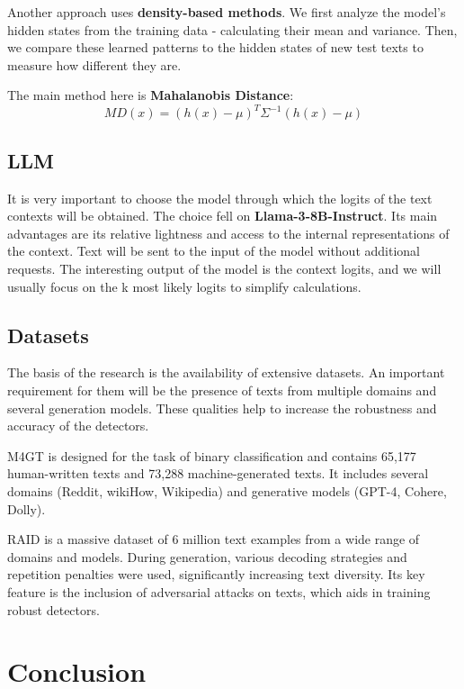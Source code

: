 \documentclass[a4paper, 12pt]{article}
\begin{document}
Another approach uses \textbf{density-based methods}. We first analyze the model's hidden states from the training data - calculating their mean and variance. Then, we compare these learned patterns to the hidden states of new test texts to measure how different they are.

The main method here is \textbf{Mahalanobis Distance}:
$$MD(x) = (h(x) - \mu)^T \Sigma^{-1} (h(x) - \mu)$$

\subsection{LLM}

It is very important to choose the model through which the logits of the text contexts will be obtained. The choice fell on \textbf{Llama-3-8B-Instruct}. Its main advantages are its relative lightness and access to the internal representations of the context. Text will be sent to the input of the model without additional requests. The interesting output of the model is the context logits, and we will usually focus on the k most likely logits to simplify calculations.

\subsection{Datasets}

The basis of the research is the availability of extensive datasets. An important requirement for them will be the presence of texts from multiple domains and several generation models. These qualities help to increase the robustness and accuracy of the detectors.

M4GT\citep{wang2024m4gt} is designed for the task of binary classification and contains 65,177 human-written texts and 73,288 machine-generated texts. It includes several domains (Reddit, wikiHow, Wikipedia) and generative models (GPT-4, Cohere, Dolly).

RAID\citep{RAID} is a massive dataset of 6 million text examples from a wide range of domains and models. During generation, various decoding strategies and repetition penalties were used, significantly increasing text diversity. Its key feature is the inclusion of adversarial attacks on texts, which aids in training robust detectors.

\section{Conclusion}



\end{document}
